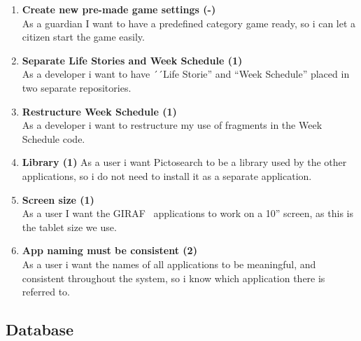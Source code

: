 \begin{enumerate}
	\item \textbf{Create new pre-made game settings (-)}\\
	As a guardian I want to have a predefined category game ready, so i can let a citizen start the game easily. 
	
	\item \textbf{Separate Life Stories and Week Schedule (1)}\\
	As a developer i want to have ´´Life Storie'' and ``Week Schedule'' placed in two separate repositories.
	
	\item \textbf{Restructure Week Schedule (1)}\\
	As a developer i want to restructure my use of fragments in the Week Schedule code.
	
	\item \textbf{Library (1)}
	As a user i want Pictosearch to be a library used by the other applications, so i do not need to install it as a separate application.
	
	\item \textbf{Screen size (1)}\\
	As a user I want the GIRAF~ applications to work on a 10” screen, as this is the tablet size we use.
	
	\item \textbf{App naming must be consistent (2)}\\
	As a user i want the names of all applications to be meaningful, and consistent throughout the system, so i know which application there is referred to.
\end{enumerate}

\subsection{Database}

